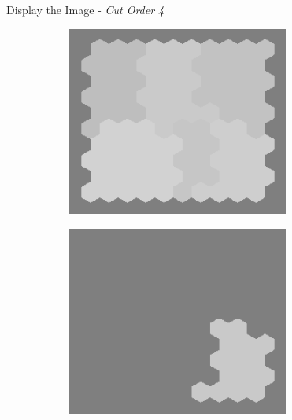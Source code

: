 \documentclass[10pt,xcolor=svgnames]{beamer} %
\begin{document}
\begin{frame}[standout]{Display the Image - \textit{Cut Order 4}}
    \begin{figure}
        \centering
        \begin{subfigure}{0.4\textwidth}
        \centering
            \includegraphics[width=0.8\textwidth]{pictures/grid_init4.png}
        \end{subfigure}
        \hfill
        \begin{subfigure}{0.4\textwidth}
            \centering
            \includegraphics[width=0.8\textwidth]{pictures/seg_9_cut4.png}
        \end{subfigure}
    \end{figure}
\end{frame}
\end{document}
